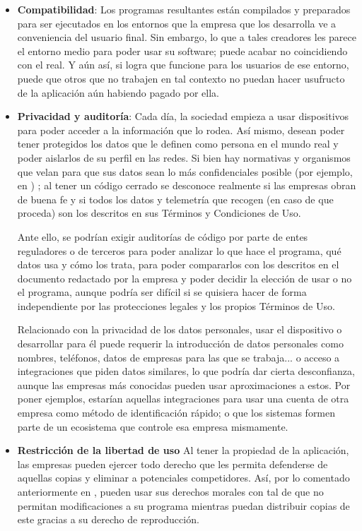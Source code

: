 \begin{itemize}
	\item \textbf{Compatibilidad}: Los programas resultantes están compilados y preparados para ser ejecutados en los entornos que la empresa que los desarrolla ve a conveniencia del usuario final. Sin embargo, lo que a tales creadores les parece el entorno medio para poder usar su software; puede acabar no coincidiendo con el real. Y aún así, si logra que funcione para los usuarios de ese entorno, puede que otros que no trabajen en tal contexto no puedan hacer usufructo de la aplicación aún habiendo pagado por ella.
	
	\item \textbf{Privacidad y auditoría}: Cada día, la sociedad empieza a usar dispositivos para poder acceder a la información que lo rodea. Así mismo, desean poder tener protegidos los datos que le definen como persona en el mundo real y poder aislarlos de su perfil en las redes. Si bien hay normativas y organismos que velan para que sus datos sean lo más confidenciales posible (por ejemplo, en \cite{lopd-2018}) ; al tener un código cerrado se desconoce realmente si las empresas obran de buena fe y si todos los datos y telemetría que recogen (en caso de que proceda) son los descritos en sus Términos y Condiciones de Uso.
	
	Ante ello, se podrían exigir auditorías de código por parte de entes reguladores o de terceros para poder analizar lo que hace el programa, qué datos usa y cómo los trata, para poder compararlos con los descritos en el documento redactado por la empresa y poder decidir la elección de usar o no el programa, aunque podría ser difícil si se quisiera hacer de forma independiente por las protecciones legales y los propios Términos de Uso.
	
	Relacionado con la privacidad de los datos personales, usar el dispositivo o desarrollar para él puede requerir la introducción de datos personales como nombres, teléfonos, datos de empresas para las que se trabaja... o acceso a integraciones que piden datos similares, lo que podría dar cierta desconfianza, aunque las empresas más conocidas pueden usar aproximaciones a estos. Por poner ejemplos, estarían aquellas integraciones para usar una cuenta de otra empresa como método de identificación rápido; o que los sistemas formen parte de un ecosistema que controle esa empresa mismamente.
	
	\item \textbf{Restricción de la libertad de uso} Al tener la propiedad de la aplicación, las empresas pueden ejercer todo derecho que les permita defenderse de aquellas copias y eliminar a potenciales competidores. Así, por lo comentado anteriormente en \cite{propint-1996}, pueden usar sus derechos morales con tal de que no permitan modificaciones a su programa mientras puedan distribuir copias de este gracias a su derecho de reproducción.
\end{itemize}

